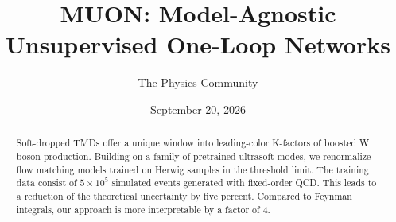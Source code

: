 \documentclass[11pt]{article}
\title{MUON: Model-Agnostic Unsupervised One-Loop Networks}
\author{The Physics Community}
\date{September 20, 2026}
\begin{document}
\maketitle
\begin{abstract}
Soft-dropped TMDs offer a unique window into leading-color K-factors of
boosted W boson production. Building on a family of pretrained ultrasoft
modes, we renormalize flow matching models trained on Herwig samples in
the threshold limit. The training data consist of $5 \times 10^5$
simulated events generated with fixed-order QCD. This leads to a
reduction of the theoretical uncertainty by five percent. Compared to
Feynman integrals, our approach is more interpretable by a factor of 4.
\end{abstract}
\tableofcontents





\nocite{*}


\end{document}
